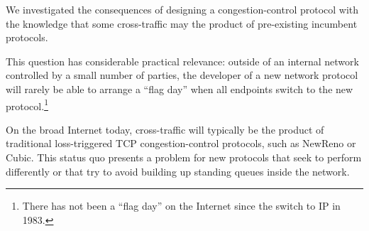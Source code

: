 \label{s:tcpaware}

We investigated the consequences of designing a congestion-control
protocol with the knowledge that some cross-traffic may the product of
pre-existing incumbent protocols.

This question has considerable practical relevance: outside of an internal network controlled by a small number of parties, the
developer of a new network protocol will rarely be able to arrange a
``flag day'' when all endpoints switch to the new
protocol.\footnote{There has not been a ``flag day'' on the Internet
  since the switch to IP in 1983.}

On the broad Internet today, cross-traffic will typically be the
product of traditional loss-triggered TCP congestion-control
protocols, such as NewReno or Cubic. This status quo presents a
problem for new protocols that seek to perform differently or
that try to avoid building up standing queues inside the network.

